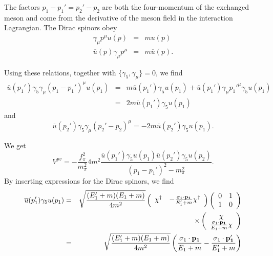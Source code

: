 \documentclass[graybox,sectrefs,envcountresetchap,open=right]{svmonodo}
\begin{document}
The factors $p_{1}-p_{1}'=p_{2}'-p_{2}$ are both the four-momentum of the 
exchanged meson and come from the derivative of the meson field in 
the interaction Lagrangian. 
The Dirac spinors obey 
\begin{eqnarray*}
\gamma_{\mu}p^{\mu}u(p)&=&mu(p) \nonumber \\
\overline{u}(p)\gamma_{\mu}p^{\mu}&=&m\overline{u}(p). \nonumber
\end{eqnarray*} 


Using these relations, together with $\{\gamma_{5},\gamma_{\mu}\}=0$, we find 
\begin{eqnarray*}
\overline{u}(p_{1}')\gamma_{5}\gamma_{\mu}(p_{1}-p_{1}')^{\mu}u(p_{1})
&=&m\overline{u}(p_{1}')\gamma_{5}u(p_{1})+\overline{u}(p_{1}')\gamma_{\mu}
p_{1}'^{\mu}\gamma_{5}u(p_{1}) \nonumber \\
 &=&2m\overline{u}(p_{1}')\gamma_{5}u(p_{1}) \nonumber
\end{eqnarray*}
and 
\[
\overline{u}(p_{2}')\gamma_{5}\gamma_{\mu}(p_{2}'-p_{2})^{\mu}=
-2m\overline{u}(p_{2}')\gamma_{5}u(p_{1}).
\]



We get
\[
V^{pv}=-\frac{f_{\pi}^{2}}{m_{\pi}^{2}}4m^{2}\frac{\overline{u}(p_{1}')
\gamma_{5}u(p_{1})\overline{u}(p_{2}')\gamma_{5}u(p_{2})}{(p_{1}-p_{1}')
^{2}-m_{\pi}^{2}}.
\]
By inserting expressions for the Dirac spinors, we find
\begin{eqnarray*}
\overline{u}(p_{1}')\gamma_{5}u(p_{1})&=&\sqrt{\frac{(E_{1}'+m)(E_{1}+m)}
{4m^{2}}}\left(\begin{array}{cc}\chi^{\dagger}&-\frac{\sigma_{1}\cdot{
\bf p_{1}}}{E_{1}'
+m}\chi^{\dagger}\end{array}\right)\left(\begin{array}{cc}0&1\\1&0\end{array}
\right)\nonumber \\
 &&\times \left(\begin{array}{c}\chi\\ \frac{\sigma_{1}\cdot\mathbf{p_{1}}}{E_{1}+m}\chi
\end{array}\right) 
\nonumber \\
 &=&\sqrt{\frac{(E_{1}'+m)(E_{1}+m)}{4m^{2}}}\left(\frac{\sigma_{1}\cdot
\mathbf{p_{1}}}{E_{1}+m}-\frac{\sigma_{1}\cdot\mathbf{p_{1}'}}{E_{1}'+m}\right) 
\nonumber 
\end{eqnarray*}
\end{document}
